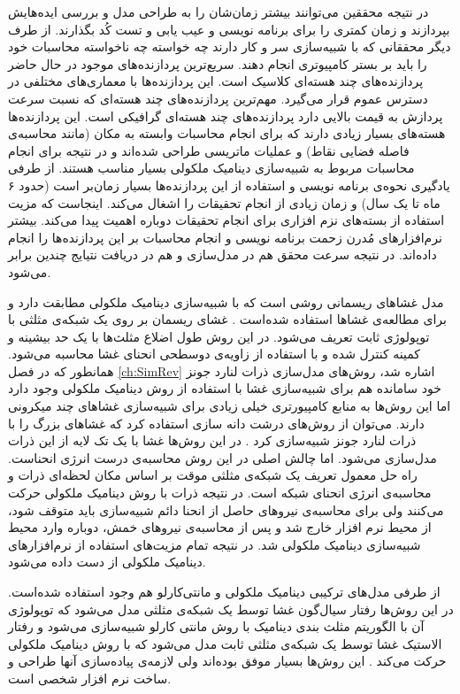 در نتیجه محققین می‌توانند بیشتر زمان‌شان را به طراحی مدل و بررسی ایده‌هایش بپردازند و زمان کمتری را برای برنامه نویسی و عیب یابی  و تست کُد بگذارند. از طرف دیگر محققانی که با شبیه‌سازی سر و کار دارند چه خواسته چه ناخواسته محاسبات خود را باید بر بستر کامپیوتر‌ی انجام دهند. سریع‌ترین  پردازنده‌های موجود در حال حاضر پردازنده‌های چند هسته‌ای
 کلاسیک است. این پردازنده‌ها با معماری‌های مختلفی در دسترس عموم قرار می‌گیرد. مهم‌ترین پردازند‌ه‌های چند هسته‌ای که  نسبت سرعت پردازش به  قیمت بالایی دارد پردازنده‌های چند هسته‌ای گرافیکی
است. این پردازنده‌‌ها هسته‌های بسیار زیادی دارند که برای انجام محاسبات وابسته به مکان (مانند محاسبه‌ی فاصله‌ فضایی نقاط) 
و عملیات ماتریسی طراحی شده‌اند و در نتیجه برای انجام محاسبات مربوط به شبیه‌سازی دینامیک ملکولی بسیار مناسب هستند.  از طرفی یادگیری نحوه‌ی برنامه نویسی و استفاده از این پردازنده‌ها بسیار زمان‌بر است (حدود ۶ ماه تا یک سال) و زمان زیادی از انجام تحقیقات را اشغال می‌کند. اینجاست که مزیت استفاده از بسته‌های نزم افزاری برای انجام تحقیقات دوباره اهمیت پیدا می‌کند. بیشتر نرم‌افزار‌های مُدرن زحمت برنامه نویسی و انجام محاسبات بر این پردازنده‌ها را انجام داده‌اند. در نتیجه سرعت محقق هم در مدل‌سازی و هم در دریافت نتیایج چندین برابر می‌شود.

مدل غشا‌های ریسمانی روشی است که با شبیه‌سازی دینامیک ملکولی مطابقت دارد و برای مطالعه‌ی غشا‌ها استفاده شده‌است
\cite{Abraham1989PRL}
. غشای ریسمان بر روی یک شبکه‌ی مثلثی با توپولوژی ثابت تعریف می‌شود. در این روش طول اضلاع مثلث‌ها با یک حد بیشینه و کمینه کنترل شده و با استفاده از زاویه‌ی دوسطحی 
انحنای غشا محاسبه می‌شود. همانطور که در فصل
\ref{ch:SimRev}
 اشاره شد، روش‌های مدل‌سازی ذرات لنارد جونز خود سامانده هم برای شبیه‌سازی غشا با استفاده از روش دینامیک ملکولی وجود دارد 
 \cite{Discher2004NatMat, Schindler2016BBA}
 اما این روش‌ها به منابع کامپیورتری خیلی زیادی برای شبیه‌‌سازی غشا‌های چند میکرونی دارند. می‌توان از روش‌های درشت دانه سازی استفاده کرد که غشا‌های بزرگ را با ذرات لنارد جونز شبیه‌سازی کرد
 \cite{Li2005}
 . در این روش‌ها غشا با یک تک لایه از این ذرات مدل‌سازی می‌شود. اما چالش اصلی در این روش محاسبه‌ی درست انرژی انحناست. راه حل معمول تعریف یک شبکه‌ی مثلثی موقت بر اساس مکان لحظه‌ای ذرات و محاسبه‌ی انرژی انحنای شبکه است. در نتیجه ذرات با روش دینامیک ملکولی حرکت می‌کنند ولی برای محاسبه‌ی نیروهای حاصل از انحنا دائم شبیه‌سازی باید متوقف شود، از محیط نرم افزار خارج شد و پس از محاسبه‌ی نیرو‌های خمش، دوباره وارد محیط شبیه‌سازی دینامیک ملکولی شد. در نتیجه تمام مزیت‌های استفاده از نرم‌افزار‌های دینامیک ملکولی از دست داده می‌شود.
 
 از طرفی مدل‌های ترکیبی دینامیک ملکولی و مانتی‌کارلو هم وجود استفاده شده‌است. در این روش‌ها رفتار سیال‌گون غشا توسط یک شبکه‌ی مثلثی مدل‌ می‌شود که توپولوژی آن با الگوریتم مثلث بندی دینامیک با روش مانتی کارلو شبیه‌سازی می‌شود و رفتار الاستیک غشا توسط یک شبکه‌ی مثلثی ثابت مدل می‌شود که با روش دینامیک ملکولی حرکت می‌کند
 \cite{Noguchi2005PNAS}
 . این روش‌ها بسیار موفق بوده‌اند ولی لازمه‌ی پیاده‌سازی آنها طراحی و ساخت نرم افزار شخصی است.
  













